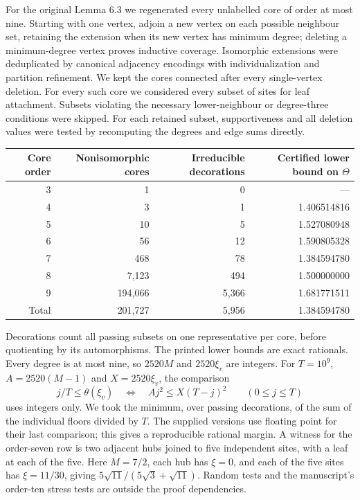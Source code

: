 \documentclass[11pt,a4paper]{article}
\theoremstyle{remark}\newtheorem*{remark}{Remark}
\begin{document}
For the original Lemma 6.3 we regenerated every unlabelled core of order at most nine. Starting with one vertex, adjoin a new vertex on each possible neighbour set, retaining the extension when its new vertex has minimum degree; deleting a minimum-degree vertex proves inductive coverage. Isomorphic extensions were deduplicated by canonical adjacency encodings with individualization and partition refinement. We kept the cores connected after every single-vertex deletion. For every such core we considered every subset of sites for leaf attachment. Subsets violating the necessary lower-neighbour or degree-three conditions were skipped. For each retained subset, supportiveness and all deletion values were tested by recomputing the degrees and edge sums directly.
\begin{center}\small
\begin{tabular}{rrrr}
\toprule
Core order & Nonisomorphic cores & Irreducible decorations & Certified lower bound on $\Theta$\\\midrule
3 & 1 & 0 & ---\\
4 & 3 & 1 & 1.406514816\\
5 & 10 & 5 & 1.527080948\\
6 & 56 & 12 & 1.590805328\\
7 & 468 & 78 & 1.384594780\\
8 & 7,123 & 494 & 1.500000000\\
9 & 194,066 & 5,366 & 1.681771511\\\midrule
Total & 201,727 & 5,956 & 1.384594780\\\bottomrule
\end{tabular}\end{center}
Decorations count all passing subsets on one representative per core, before quotienting by its automorphisms. The printed lower bounds are exact rationals. Every degree is at most nine, so $2520M$ and $2520\xi_v$ are integers. For $T=10^9$, $A=2520(M-1)$ and $X=2520\xi_v$, the comparison
\[
 j/T\le\theta(\xi_v)\quad\Longleftrightarrow\quad A j^2\le X(T-j)^2\qquad(0\le j\le T)
\]
uses integers only. We took the minimum, over passing decorations, of the sum of the individual floors divided by $T$. The supplied versions use floating point for their last comparison; this gives a reproducible rational margin. A witness for the order-seven row is two adjacent hubs joined to five independent sites, with a leaf at each of the five. Here $M=7/2$, each hub has $\xi=0$, and each of the five sites has $\xi=11/30$, giving $5\sqrt{11}/(5\sqrt3+\sqrt{11})$. Random tests and the manuscript's order-ten stress tests are outside the proof dependencies.
\end{document}
